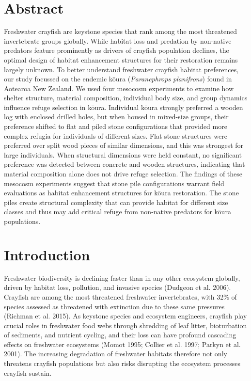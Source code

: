 \documentclass[
  12pt,
  a4paper,
  oneside]{scrbook}
\begin{document}
\section*{Abstract}\label{abstract-3}

Freshwater crayfish are keystone species that rank among the most
threatened invertebrate groups globally. While habitat loss and
predation by non-native predators feature prominently as drivers of
crayfish population declines, the optimal design of habitat enhancement
structures for their restoration remains largely unknown. To better
understand freshwater crayfish habitat preferences, our study focussed
on the endemic kōura (\emph{Paranephrops planifrons}) found in Aotearoa
New Zealand. We used four mesocosm experiments to examine how shelter
structure, material composition, individual body size, and group
dynamics influence refuge selection in kōura. Individual kōura strongly
preferred a wooden log with enclosed drilled holes, but when housed in
mixed-size groups, their preference shifted to flat and piled stone
configurations that provided more complex refugia for individuals of
different sizes. Flat stone structures were preferred over split wood
pieces of similar dimensions, and this was strongest for large
individuals. When structural dimensions were held constant, no
significant preference was detected between concrete and wooden
structures, indicating that material composition alone does not drive
refuge selection. The findings of these mesocosm experiments suggest
that stone pile configurations warrant field evaluations as habitat
enhancement structures for kōura restoration. The stone piles create
structural complexity that can provide habitat for different size
classes and thus may add critical refuge from non-native predators for
kōura populations.

\section{Introduction}\label{introduction-2}

Freshwater biodiversity is declining faster than in any other ecosystem
globally, driven by habitat loss, pollution, and invasive species
(Dudgeon et al. 2006). Crayfish are among the most threatened freshwater
invertebrates, with 32\% of species assessed as threatened with
extinction due to these same pressures (Richman et al. 2015). As
keystone species and ecosystem engineers, crayfish play crucial roles in
freshwater food webs through shredding of leaf litter, bioturbation of
sediments, and nutrient cycling, and their loss can have profound
cascading effects on freshwater ecosystems (Momot 1995; Collier et al.
1997; Parkyn et al. 2001). The increasing degradation of freshwater
habitats therefore not only threatens crayfish populations but also
risks disrupting the ecosystem processes crayfish sustain.
\end{document}

